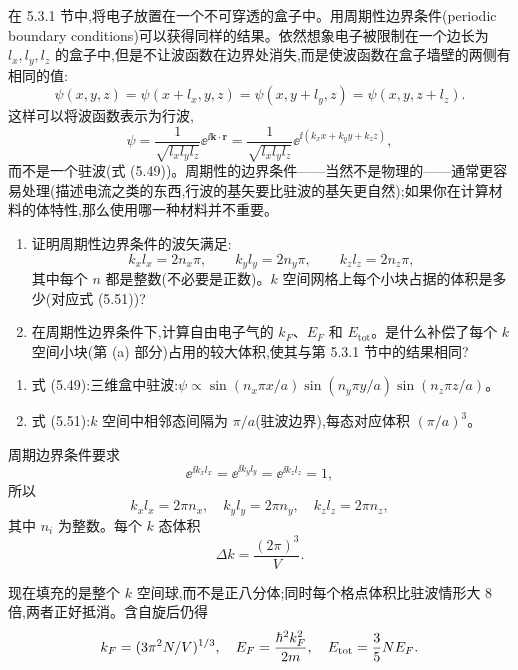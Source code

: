 \begin{question}
在 5.3.1 节中,将电子放置在一个不可穿透的盒子中。用周期性边界条件(periodic boundary conditions)可以获得同样的结果。依然想象电子被限制在一个边长为 $l_x,l_y,l_z$ 的盒子中,但是不让波函数在边界处消失,而是使波函数在盒子墙壁的两侧有相同的值:
\[
\psi(x,y,z)=\psi(x+l_x,y,z)=\psi(x,y+l_y,z)=\psi(x,y,z+l_z).
\]
这样可以将波函数表示为行波,
\[
\psi=\frac{1}{\sqrt{l_xl_yl_z}}\ee^{\ii\mathbf k\cdot\mathbf r}=\frac{1}{\sqrt{l_xl_yl_z}}\ee^{\ii(k_xx+k_yy+k_zz)},
\]
而不是一个驻波(式 (5.49))。周期性的边界条件——当然不是物理的——通常更容易处理(描述电流之类的东西,行波的基矢要比驻波的基矢更自然);如果你在计算材料的体特性,那么使用哪一种材料并不重要。
\begin{enumerate}
\item 证明周期性边界条件的波矢满足:
\[
k_xl_x=2n_x\pi,\qquad k_yl_y=2n_y\pi,\qquad k_zl_z=2n_z\pi,
\]
其中每个 $n$ 都是整数(不必要是正数)。$k$ 空间网格上每个小块占据的体积是多少(对应式 (5.51))?
\item 在周期性边界条件下,计算自由电子气的 $k_F$、$E_F$ 和 $E_{\mathrm{tot}}$。是什么补偿了每个 $k$ 空间小块(第 (a) 部分)占用的较大体积,使其与第 5.3.1 节中的结果相同?
\end{enumerate}

\par\smallskip
{}
\begin{enumerate}[leftmargin=2.2em,itemsep=0.12em,topsep=0.12em,parsep=0pt]
\item 式 (5.49):三维盒中驻波:$\psi\propto\sin(n_x\pi x/a)\sin(n_y\pi y/a)\sin(n_z\pi z/a)$。
\item 式 (5.51):$k$ 空间中相邻态间隔为 $\pi/a$(驻波边界),每态对应体积 $(\pi/a)^3$。
\end{enumerate}

\end{question}
\begin{solution}

周期边界条件要求
\[
\ee^{\ii k_xl_x}=\ee^{\ii k_yl_y}=\ee^{\ii k_zl_z}=1,
\]
所以
\[
k_xl_x=2\pi n_x,
\quad k_yl_y=2\pi n_y,
\quad k_zl_z=2\pi n_z,
\]
其中 $n_i$ 为整数。每个 $k$ 态体积
\[
\Delta k=\frac{(2\pi)^3}{V}.
\]

现在填充的是整个 $k$ 空间球,而不是正八分体;同时每个格点体积比驻波情形大 $8$ 倍,两者正好抵消。含自旋后仍得
\[
k_F=(3\pi^2N/V)^{1/3},
\quad E_F=\frac{\hbar^2k_F^2}{2m},
\quad E_{\rm tot}=\frac35NE_F.
\]

\end{solution}
